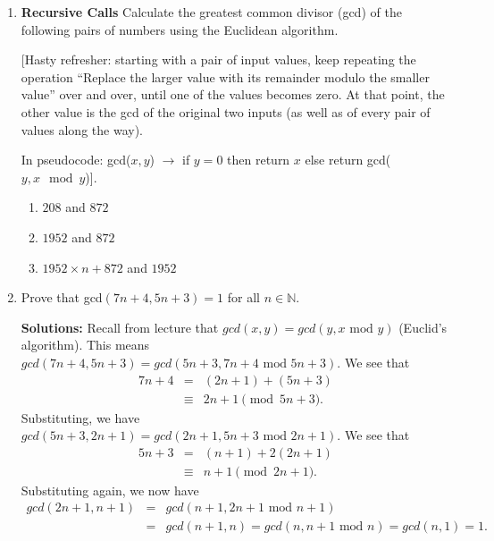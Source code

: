 \documentclass[11pt]{article}
\newif\ifsolutions
\begin{document}
\maketitle

\begin{enumerate}

\item {\bf Recursive Calls}  Calculate the greatest common divisor (gcd) of the following pairs of numbers using the Euclidean algorithm.

[Hasty refresher: starting with a pair of input values, keep repeating the operation ``Replace the larger value with its remainder modulo the smaller value'' over and over, until one of the values becomes zero. At that point, the other value is the gcd of the original two inputs (as well as of every pair of values along the way).

In pseudocode: gcd($x, y$) $\rightarrow$ if $y = 0$ then return $x$ else return gcd($y, x\mod y$)].

\begin{enumerate}
\item $208$ and $872$
\item $1952$ and $872$
\item $1952 \times n + 872$ and $1952$
\end{enumerate}

\ifsolutions
\textbf{Motivation for Problem:} This is supposed to be a quick refresher for the gcd algorithm, and attempts to show how gcd creates recursive calls of other gcd that we can use to shortcut.

\textbf{Solutions:} 8 for all of these. The first answer students should calculate by hand, the second answer will reduce to the first after one step, and the third answer will reduce to the second in one step.  \fi

\item Prove that gcd$(7n+4,5n+3)=1$ for all $n\in\mathbb{N}$.

\ifsolutions 
\textbf{Solutions:} Recall from lecture that $gcd(x, y) = gcd(y, x \text{ mod } y)$ (Euclid's algorithm). This means $gcd(7n+4,5n+3) = gcd(5n + 3, 7n + 4 \text{ mod } 5n + 3)$. We see that
\begin{eqnarray*}
7n + 4 &=&  (2n + 1) + (5n + 3)\\
&\equiv& 2n + 1 \pmod {5n + 3}.
\end{eqnarray*}
Substituting, we have $gcd(5n + 3, 2n + 1) = gcd(2n + 1, 5n + 3 \text{ mod } 2n + 1)$. We see that
\begin{eqnarray*}
5n + 3 &=& (n + 1) + 2(2n + 1)\\
&\equiv& n + 1 \pmod {2n + 1}.
\end{eqnarray*}
Substituting again, we now have 
\begin{eqnarray*}
gcd(2n + 1, n + 1) &=& gcd(n+ 1, 2n + 1 \text{ mod } n + 1) \\
&=& gcd(n + 1, n) = gcd(n, n + 1 \text{ mod } n) = gcd(n, 1) = 1.
\end{eqnarray*}


\end{enumerate}
\end{document}
